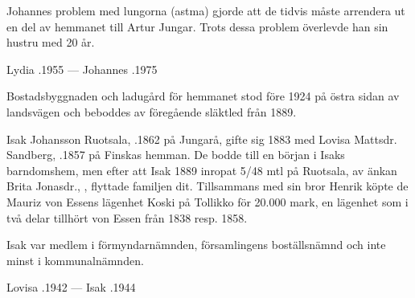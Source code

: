 Johannes problem med lungorna (astma) gjorde att de tidvis måste arrendera ut en del av hemmanet till Artur Jungar. Trots dessa problem överlevde han sin hustru med 20 år.
\begin{jhchildren}
  \item {}
  \item {}
\end{jhchildren}

Lydia .1955  ---  Johannes .1975



Bostadsbyggnaden och ladugård för hemmanet stod före 1924 på östra sidan av landsvägen och beboddes av föregående släktled från 1889.\jhvspace{}


Isak Johansson Ruotsala, .1862 på Jungarå,  gifte sig 1883 med Lovisa Mattsdr. Sandberg, .1857 på Finskas hemman. De bodde till en början i Isaks barndomshem, men efter att Isak 1889 inropat 5/48 mtl på Ruotsala, av änkan Brita Jonasdr., , flyttade familjen dit. Tillsammans med sin bror Henrik köpte de Mauriz von Essens lägenhet Koski på Tollikko för 20.000 mark, en lägenhet som i två delar tillhört von Essen från 1838 resp. 1858.

Isak var medlem i förmyndarnämnden, församlingens boställsnämnd och inte minst i kommunalnämnden.
\begin{jhchildren}
  \item {}
  \item {}
  \item {}
  \item {}
  \item {}
  \item {}
  \item {}
\end{jhchildren}

Lovisa .1942  ---  Isak .1944



